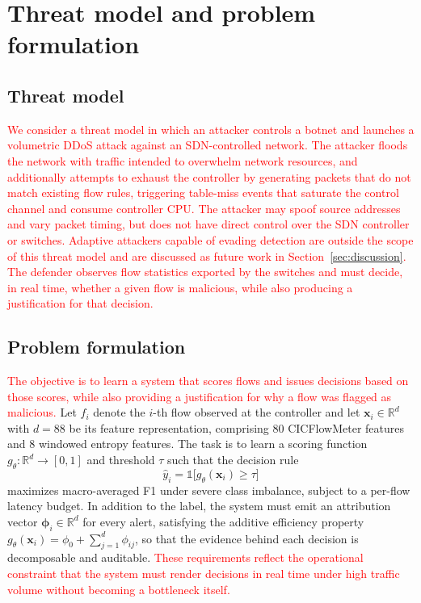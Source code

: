 \documentclass{ieeeaccess}
\begin{document}
\section{Threat model and problem formulation}
\label{sec:threat}

\subsection{Threat model}
\textcolor{red}{We consider a threat model in which an attacker controls a botnet and launches a volumetric DDoS attack against an SDN-controlled network. The attacker floods the network with traffic intended to overwhelm network resources, and additionally attempts to exhaust the controller by generating packets that do not match existing flow rules, triggering table-miss events that saturate the control channel and consume controller CPU. The attacker may spoof source addresses and vary packet timing, but does not have direct control over the SDN controller or switches. Adaptive attackers capable of evading detection are outside the scope of this threat model and are discussed as future work in Section~\ref{sec:discussion}. The defender observes flow statistics exported by the switches and must decide, in real time, whether a given flow is malicious, while also producing a justification for that decision.}

\subsection{Problem formulation}
\textcolor{red}{The objective is to learn a system that scores flows and issues decisions based on those scores, while also providing a justification for why a flow was flagged as malicious.} Let $f_i$ denote the $i$-th flow observed at the controller and let $\mathbf{x}_i \in \mathbb{R}^{d}$ with $d=88$ be its feature representation, comprising $80$ CICFlowMeter features and $8$ windowed entropy features. The task is to learn a scoring function $g_{\theta}\colon \mathbb{R}^{d} \to [0,1]$ and threshold $\tau$ such that the decision rule
\begin{equation}
\hat{y}_i = \mathbb{1}\bigl[g_{\theta}(\mathbf{x}_i) \geq \tau\bigr]
\label{eq:decision}
\end{equation}
maximizes macro-averaged F1 under severe class imbalance, subject to a per-flow latency budget. In addition to the label, the system must emit an attribution vector $\boldsymbol{\phi}_i \in \mathbb{R}^{d}$ for every alert, satisfying the additive efficiency property $g_{\theta}(\mathbf{x}_i) = \phi_0 + \sum_{j=1}^{d} \phi_{ij}$, so that the evidence behind each decision is decomposable and auditable. \textcolor{red}{These requirements reflect the operational constraint that the system must render decisions in real time under high traffic volume without becoming a bottleneck itself.}
\end{document}
